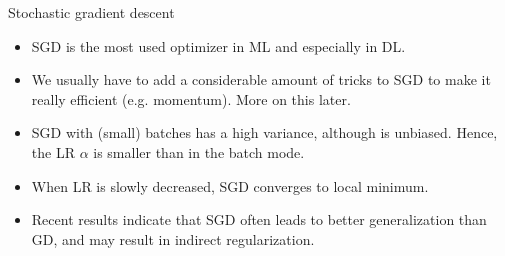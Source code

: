 \begin{vbframe}{Stochastic gradient descent}
  \begin{itemize}
    \item SGD is the most used optimizer in ML and especially in DL.
    \item We usually have to add a considerable amount of tricks to SGD to make it really 
        efficient (e.g. momentum). More on this later.
    \item SGD with (small) batches has a high variance, although is unbiased. 
      Hence, the LR $\alpha$ is smaller than in the batch mode.
    \item When LR is slowly decreased, SGD converges to  local minimum.
    \item Recent results indicate that SGD often leads to better generalization than GD, and may result in indirect regularization.
   \end{itemize}
\vspace*{0.5cm}



\end{vbframe}


\endlecture

